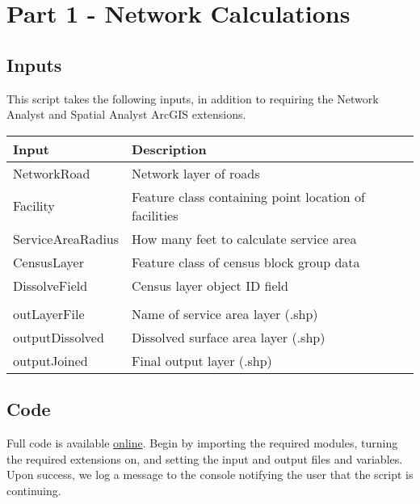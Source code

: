 \documentclass[11pt,]{article}
\begin{document}
\section{Part 1 - Network
Calculations}\label{part-1---network-calculations}

\subsection{Inputs}\label{inputs}

This script takes the following inputs, in addition to requiring the
Network Analyst and Spatial Analyst ArcGIS extensions.

\begin{longtable}[]{@{}ll@{}}
\toprule
Input & Description\tabularnewline
\midrule
\endhead
NetworkRoad & Network layer of roads\tabularnewline
Facility & Feature class containing point location of
facilities\tabularnewline
ServiceAreaRadius & How many feet to calculate service
area\tabularnewline
CensusLayer & Feature class of census block group data\tabularnewline
DissolveField & Census layer object ID field\tabularnewline
\tabularnewline
outLayerFile & Name of service area layer (.shp)\tabularnewline
outputDissolved & Dissolved surface area layer (.shp)\tabularnewline
outputJoined & Final output layer (.shp)\tabularnewline
\bottomrule
\end{longtable}

\subsection{Code}\label{code}

\noindent Full code is available
\href{https://github.com/johnmbrandt/public-resource-mapper}{online}.
Begin by importing the required modules, turning the required extensions
on, and setting the input and output files and variables. Upon success,
we log a message to the console notifying the user that the script is
continuing.
\end{document}
